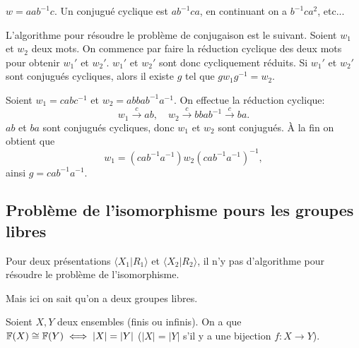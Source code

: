     \begin{ex}
      $w = aab^{-1}c$. Un conjugué cyclique est $ab^{-1}ca$, en continuant on a $b^{-1}ca^2$, etc...
    \end{ex}

    L'algorithme pour résoudre le problème de conjugaison est le suivant. Soient $w_1$ et $w_2$ deux mots. On
    commence par faire la réduction cyclique des deux mots pour obtenir $w_1'$ et $w_2'$. $w_1'$ et $w_2'$
    sont donc cycliquement réduits. Si $w_1'$ et $w_2'$ sont conjugués cycliques, alors il existe $g$ tel que
    $gw_1g^{-1} = w_2$.

    \begin{ex}
      Soient $w_1 = cabc^{-1}$ et $w_2 = abbab^{-1}a^{-1}$. On effectue la réduction cyclique:
        \[w_1 \xrightarrow{c} ab, \quad w_2 \xrightarrow{c} bbab^{-1} \xrightarrow{c} ba.\]
      $ab$ et $ba$ sont conjugués cycliques, donc $w_1$ et $w_2$ sont conjugués. À la fin on obtient que 
        \[w_1 = (cab^{-1}a^{-1})w_2(cab^{-1}a^{-1})^{-1},\]
      ainsi $g = cab^{-1}a^{-1}$.
    \end{ex}

    \subsection{Problème de l'isomorphisme pours les groupes libres}
    \label{sec:pb-isom-grps-libres}

    Pour deux présentations $\langle X_1 | R_1 \rangle$ et $\langle X_2 | R_2 \rangle$, il n'y pas
    d'algorithme pour résoudre le problème de l'isomorphisme.


    Mais ici on sait qu'on a deux groupes libres.

    \begin{theo}
      Soient $X,Y$ deux ensembles (finis ou infinis). On a que $\mathbb{F}(X) \cong \mathbb{F}(Y) \iff |X| = |Y|$ ($|X| = |Y|$
      s'il y a une bijection $f:X \to Y$).
    \end{theo}

